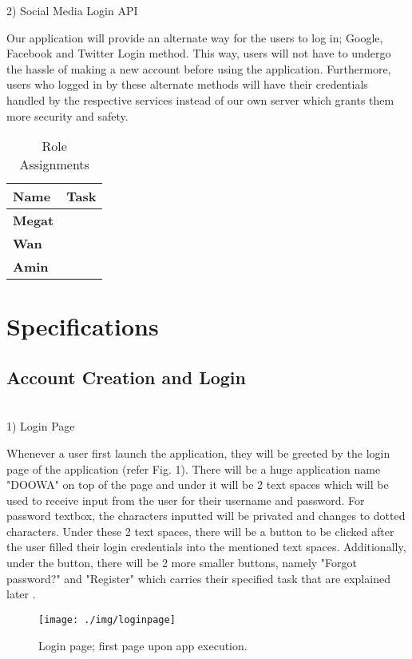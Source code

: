 \documentclass[conference]{IEEEtran}
\begin{document}
2) Social Media Login API\\
\par Our application will provide an alternate way for the users to log in; Google, Facebook and Twitter Login method. This way, users will not have to undergo the hassle of making a new account before using the application. Furthermore, users who logged in by these alternate methods will have their credentials handled by the respective services instead of our own server which grants them more security and safety.\\


\begin{table}[htbp]
\caption{Role Assignments}
\begin{center}
\begin{tabular}{ | m{4em} | m{6cm}| } 
  \hline
 \textbf{Name}& \textbf{Task}  \\
\hline
  \textbf{Megat} &   \\
  \hline
  \textbf{Wan} & \\ 
  \hline
  \textbf{Amin} & \\
  \hline
\end{tabular}
\end{center}
\end{table}

\section{Specifications}
\subsection{Account Creation and Login}

\\1) Login Page

Whenever a user first launch the application, they will be greeted by the login page of the application (refer Fig. 1). There will be a huge application name "DOOWA" on top of the page and under it will be 2 text spaces which will be used to receive input from the user for their username and password. For password textbox, the characters inputted will be privated and changes to dotted characters. Under these 2 text spaces, there will be a button to be clicked after the user filled their login credentials into the mentioned text spaces. Additionally, under the button, there will be 2 more smaller buttons, namely "Forgot password?" and "Register" which carries their specified task that are explained later .
\begin{figure}[h!]
\texttt{[image: ./img/loginpage]}
\centering
\caption{Login page; first page upon app execution.}
\end{figure}
\end{document}

